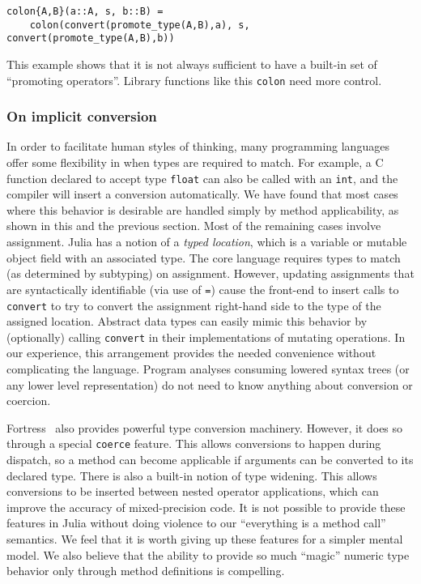 \begin{verbatim}
colon{A,B}(a::A, s, b::B) =
    colon(convert(promote_type(A,B),a), s, convert(promote_type(A,B),b))
\end{verbatim}

This example shows that it is not always sufficient to have a built-in set of
``promoting operators''.
Library functions like this \texttt{colon} need more control.

\subsubsection{On implicit conversion}

In order to facilitate human styles of thinking, many programming languages offer
some flexibility in when types are required to match.
For example, a C function declared to accept type \texttt{float}
can also be called with an \texttt{int}, and the compiler will
insert a conversion automatically.
We have found that most cases where this behavior is desirable
are handled simply by method applicability, as shown in this and the
previous section.
Most of the remaining cases involve assignment.
Julia has a notion of a \emph{typed location}, which is a variable
or mutable object field with an associated type.
The core language requires types to match (as determined by subtyping)
on assignment.
However, updating assignments that are syntactically identifiable
(via use of \texttt{=}) cause the front-end to insert calls to
\texttt{convert} to try to convert the assignment right-hand side
to the type of the assigned location.
Abstract data types can easily mimic this behavior by (optionally)
calling \texttt{convert} in their implementations of mutating
operations.
In our experience, this arrangement provides the needed convenience
without complicating the language.
Program analyses consuming lowered syntax trees (or any lower level
representation) do not need to know anything about conversion
or coercion.

Fortress~\cite{fortresspec} also provides powerful type conversion
machinery.
However, it does so through a special \texttt{coerce} feature.
This allows conversions to happen during dispatch, so a method can
become applicable if arguments can be converted to its declared type.
There is also a built-in notion of type widening.
This allows conversions to be inserted between nested operator
applications, which can improve the accuracy of mixed-precision code.
It is not possible to provide these features in Julia without doing
violence to our ``everything is a method call'' semantics.
We feel that it is worth giving up these features for a simpler
mental model.
We also believe that the ability to provide so much ``magic'' numeric
type behavior only through method definitions is compelling.

